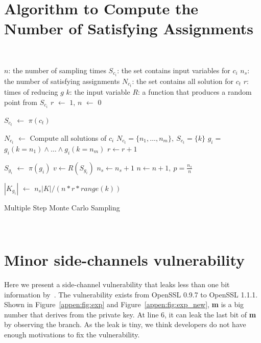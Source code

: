 \section{Algorithm to Compute the Number of Satisfying Assignments}
\label{appendix:montecarlo}
~
{\small
\IncMargin{1em}
\begin{algorithm}\small
    \SetAlgoLined
    \DontPrintSemicolon


    $n$: the number of sampling times \;
    $S_{c_i}$: the set contains input variables for $c_{i}$ \;
    $n_{s}$: the number of satisfying assignments \;
    $N_{c_t}$: the set contains all solution for $c_t$ \;
    $r$: times of reducing $g$\;
    $k$: the input variable \;
    $R$: a function that produces a random point from $S_{c_i}$\;
    $r$ $\leftarrow$ $1$,
    $n$ $\leftarrow$ $0$ \;
     {
        $S_{c_t}$ $\leftarrow$ $\pi(c_t)$ \;
        {
            $N_{c_t}$ $\leftarrow$ Compute all solutions of $c_i$ \;
            $N_{c_t} = \{n_1, \ldots, n_m\},\ S_{c_t} = \{k\}  $ \;
            $g_{i} = $ $g_i(k=n_1) \land \ldots \land g_i(k=n_m)$ \;
            $r \leftarrow r+1$ \;

        }
    }
     {
        $S_{g_i}$ $\leftarrow$ $\pi(g_i)$ \;
        $v \leftarrow R(S_{g_i})$ 
        {
           $n_s \leftarrow n_s + 1$
        }
        $n \leftarrow n +1,\ p = \frac{n_s}{n}$
    }

    $|K_{g_{i}}|$ $\leftarrow$ $n_s|K| / (n * r * range(k))$
    \caption{Multiple Step Monte Carlo Sampling}
\end{algorithm}
\DecMargin{1em}
}
~\vvv

\section{Minor side-channels vulnerability}
\label{appendix:minor:vul}
Here we present a side-channel vulnerability that leaks
less than one bit information by~\tool{}. The vulnerability exists
from OpenSSL 0.9.7 to OpenSSL 1.1.1. Shown in Figure~\ref{appen:fig:exp} 
and Figure~\ref{appen:fig:exp_new}, \textbf{m} is a big number that
derives from the private key.
At line 6, it can leak the last bit of \textbf{m} by observing the branch. 
As the leak is tiny,
we think developers do not have enough motivations
to fix the vulnerability.


